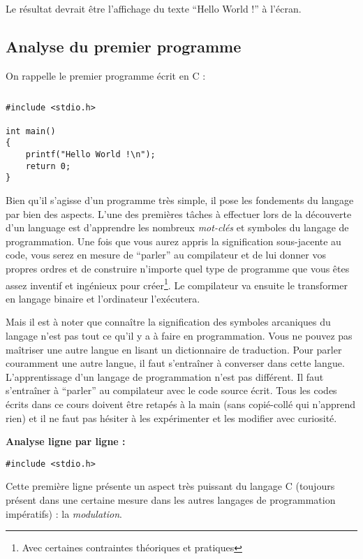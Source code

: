 \documentclass[../../main.tex]{subfiles}
\begin{document}
Le résultat devrait être l'affichage du texte ``Hello World !'' à l'écran.
\subsection{Analyse du premier programme}
On rappelle le premier programme écrit en C :
\begin{lstlisting}[title=Un premier programme]
\end{lstlisting}
\begin{verbatim}
#include <stdio.h>

int main()
{
	printf("Hello World !\n");
	return 0;
}
\end{verbatim}
Bien qu'il s'agisse d'un programme très simple, il pose les fondements du langage par bien des aspects. L'une des premières tâches à effectuer lors de la découverte d'un language est d'apprendre les nombreux \textit{mot-clés} et symboles du langage de programmation. Une fois que vous aurez appris la signification sous-jacente au code, vous serez en mesure de ``parler'' au compilateur et de lui donner vos propres ordres et de construire n'importe quel type de programme que vous êtes assez inventif et ingénieux pour créer\footnote{Avec certaines contraintes théoriques et pratiques}. Le compilateur va ensuite le transformer en langage binaire et l'ordinateur l'exécutera.

Mais il est à noter que connaître la signification des symboles arcaniques du langage n'est pas tout ce qu'il y a à faire en programmation. Vous ne pouvez pas maîtriser une autre langue en lisant un dictionnaire de traduction. Pour parler couramment une autre langue, il faut s'entraîner à converser dans cette langue. L'apprentissage d'un langage de programmation n'est pas différent. Il faut s'entraîner à ``parler'' au compilateur avec le code source écrit. Tous les codes écrits dans ce cours doivent être retapés à la main (sans copié-collé qui n'apprend rien) et il ne faut pas hésiter à les expérimenter et les modifier avec curiosité.

\textbf{Analyse ligne par ligne :}
\begin{verbatim}
#include <stdio.h>
\end{verbatim}
Cette première ligne présente un aspect très puissant du langage C (toujours présent dans une certaine mesure dans les autres langages de programmation impératifs) : la \textit{modulation}.
\end{document}
